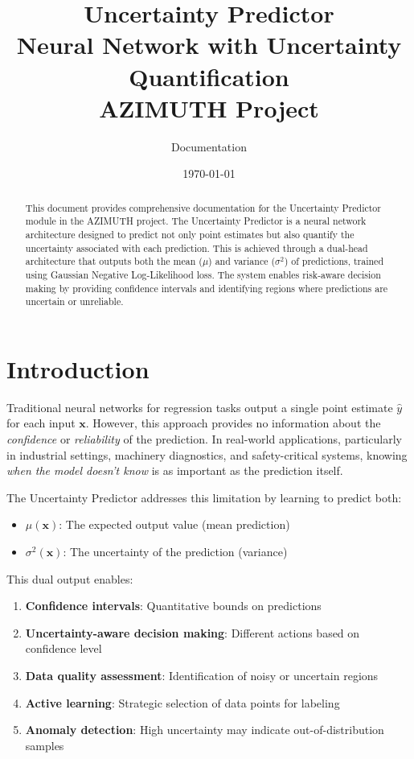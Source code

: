 \documentclass[11pt,a4paper]{article}
\title{\textbf{Uncertainty Predictor}\\
\large Neural Network with Uncertainty Quantification\\
AZIMUTH Project}
\author{Documentation}
\date{\today}
\begin{document}
\maketitle

\begin{abstract}
This document provides comprehensive documentation for the Uncertainty Predictor module in the AZIMUTH project. The Uncertainty Predictor is a neural network architecture designed to predict not only point estimates but also quantify the uncertainty associated with each prediction. This is achieved through a dual-head architecture that outputs both the mean ($\mu$) and variance ($\sigma^2$) of predictions, trained using Gaussian Negative Log-Likelihood loss. The system enables risk-aware decision making by providing confidence intervals and identifying regions where predictions are uncertain or unreliable.
\end{abstract}

\tableofcontents
\newpage

\section{Introduction}

Traditional neural networks for regression tasks output a single point estimate $\hat{y}$ for each input $\mathbf{x}$. However, this approach provides no information about the \emph{confidence} or \emph{reliability} of the prediction. In real-world applications, particularly in industrial settings, machinery diagnostics, and safety-critical systems, knowing \emph{when the model doesn't know} is as important as the prediction itself.

The Uncertainty Predictor addresses this limitation by learning to predict both:
\begin{itemize}
    \item $\mu(\mathbf{x})$: The expected output value (mean prediction)
    \item $\sigma^2(\mathbf{x})$: The uncertainty of the prediction (variance)
\end{itemize}

This dual output enables:
\begin{enumerate}
    \item \textbf{Confidence intervals}: Quantitative bounds on predictions
    \item \textbf{Uncertainty-aware decision making}: Different actions based on confidence level
    \item \textbf{Data quality assessment}: Identification of noisy or uncertain regions
    \item \textbf{Active learning}: Strategic selection of data points for labeling
    \item \textbf{Anomaly detection}: High uncertainty may indicate out-of-distribution samples
\end{enumerate}
\end{document}
